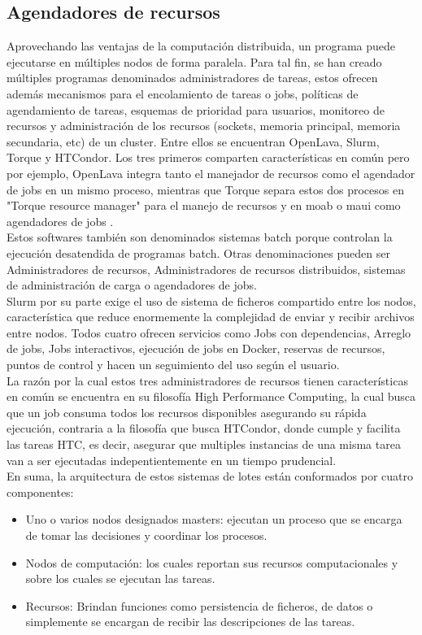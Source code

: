 \subsection{Agendadores de recursos}
Aprovechando las ventajas de la computación distribuida, un programa puede ejecutarse en múltiples nodos de forma paralela. Para tal fin, se han creado múltiples programas denominados administradores de tareas, estos ofrecen además mecanismos para el encolamiento de tareas o jobs, políticas de agendamiento de tareas, esquemas de prioridad para usuarios, monitoreo de recursos y administración de los recursos (sockets, memoria principal, memoria secundaria, etc) de un cluster. Entre ellos se encuentran OpenLava, Slurm, Torque y HTCondor. Los tres primeros comparten características en común pero por ejemplo, OpenLava integra tanto el manejador de recursos como el agendador de jobs en un mismo proceso, mientras que Torque separa estos dos procesos en "Torque resource manager" para el manejo de recursos y en moab o maui como agendadores de jobs .\\

Estos softwares también son denominados sistemas batch porque controlan la ejecución desatendida de programas batch. Otras denominaciones pueden ser Administradores de recursos, Administradores de recursos distribuidos, sistemas de administración de carga o agendadores de jobs.\\

Slurm por su parte exige el uso de sistema de ficheros compartido entre los nodos, característica que reduce enormemente la complejidad de enviar y recibir archivos entre nodos. Todos cuatro ofrecen servicios como Jobs con dependencias, Arreglo de jobs, Jobs interactivos, ejecución de jobs en Docker, reservas de recursos, puntos de control y hacen un seguimiento del uso según el usuario.\\

La razón por la cual estos tres administradores de recursos tienen características en común se encuentra en su filosofía High Performance Computing, la cual busca que un job consuma todos los recursos disponibles asegurando su rápida ejecución, contraria a la filosofía que busca HTCondor, donde cumple y facilita las tareas HTC, es decir, asegurar que multiples instancias de una misma tarea van a ser ejecutadas indepentientemente en un tiempo prudencial.\\

En suma, la arquitectura de estos sistemas de lotes están conformados por cuatro componentes:
\begin{itemize}
\item Uno o varios nodos designados masters: ejecutan un proceso que se encarga de tomar las decisiones y coordinar los procesos.
\item Nodos de computación: los cuales reportan sus recursos computacionales y sobre los cuales se ejecutan las tareas.
\item Recursos: Brindan funciones como persistencia de ficheros, de datos o simplemente se encargan de recibir las descripciones de las tareas.
\end{itemize}

